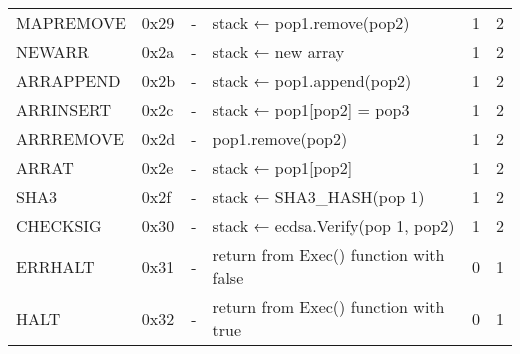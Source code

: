 \begin{longtable}[c]{L{2.5cm} L{1cm} L{3cm} L{5.5cm} R{0.8cm} R{1cm} }
MAPREMOVE & 0x29   & -                                                                                                        & stack ← pop1.remove(pop2)                                                                       & 1         & 2          \\
NEWARR    & 0x2a   & -                                                                                                        & stack ← new array                                                                                           & 1         & 2          \\
ARRAPPEND & 0x2b   & -                                                                                                        & stack ← pop1.append(pop2)                                                                            & 1         & 2          \\
ARRINSERT & 0x2c   & -                                                                                                        & stack ← pop1[pop2] = pop3                                                                                & 1         & 2          \\
ARRREMOVE & 0x2d   & -                                                                                                        & pop1.remove(pop2)                                                                                            & 1         & 2          \\
ARRAT     & 0x2e   & -                                                                                                        & stack ← pop1[pop2] & 1         & 2          \\
SHA3      & 0x2f   & -                                                                                                        & stack ← SHA3\_HASH(pop 1)                                                                                   & 1         & 2          \\
CHECKSIG  & 0x30   & -                                                                                                        & stack ← ecdsa.Verify(pop 1, pop2)                                                                          & 1         & 2          \\
ERRHALT   & 0x31   & -                                                                                                        & return from Exec() function with false                                                                      & 0         & 1          \\
HALT      & 0x32   & -                                                                                                        & return from Exec() function with true                                                                       & 0         & 1          \\* \bottomrule
\end{longtable}